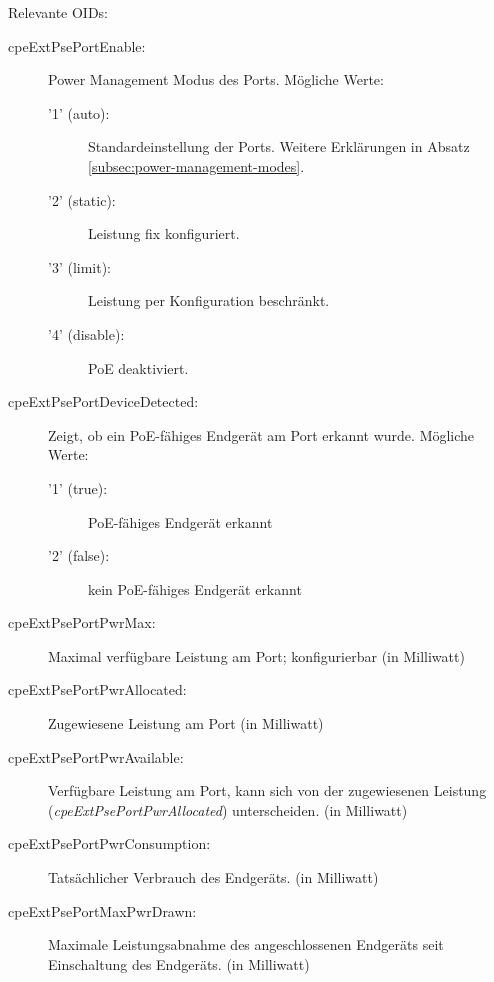 Relevante OIDs:
\begin{description}
\item[cpeExtPsePortEnable:] Power Management Modus des Ports.
M\"ogliche Werte:
\begin{description}
\item ['1' (auto):] Standardeinstellung der Ports. Weitere Erkl\"arungen in Absatz \ref{subsec:power-management-modes}.
\item ['2' (static):] Leistung fix konfiguriert.
\item ['3' (limit):] Leistung per Konfiguration beschr\"ankt.
\item ['4' (disable):] PoE deaktiviert.
\end{description}

\item[cpeExtPsePortDeviceDetected:] Zeigt, ob ein PoE-f\"ahiges Endger\"at am Port erkannt wurde.
M\"ogliche Werte:
\begin{description}
\item ['1' (true):] PoE-f\"ahiges Endger\"at erkannt
\item ['2' (false):] kein PoE-f\"ahiges Endger\"at erkannt
\end{description}

\item[cpeExtPsePortPwrMax:] Maximal verf\"ugbare Leistung am Port; konfigurierbar (in Milliwatt)
\item[cpeExtPsePortPwrAllocated:] Zugewiesene Leistung am Port (in Milliwatt)
\item[cpeExtPsePortPwrAvailable:] Verf\"ugbare Leistung am Port, kann sich von der zugewiesenen Leistung (\emph{cpeExtPsePortPwrAllocated}) unterscheiden. (in Milliwatt)
\item[cpeExtPsePortPwrConsumption:] Tats\"achlicher Verbrauch des Endger\"ats. (in Milliwatt)
\item[cpeExtPsePortMaxPwrDrawn:] Maximale Leistungsabnahme des angeschlossenen Endger\"ats seit Einschaltung des Endger\"ats. (in Milliwatt)

\end{description}





